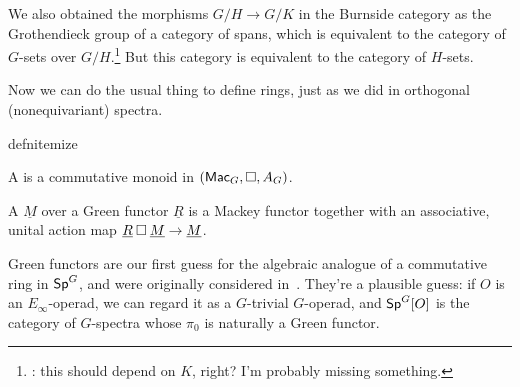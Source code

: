 We also obtained the morphisms $G/H\to G/K$ in the Burnside category as the Grothendieck group of a category of
spans, which is equivalent to the category of $G$-sets over $G/H$.\footnote{\TODO: this should depend on $K$,
right? I'm probably missing something.} But this category is equivalent to the category of $H$-sets.

Now we can do the usual thing to define rings, just as we did in orthogonal (nonequivariant) spectra.
\begin{comp}{defn}{itemize}
	\item A  is a commutative monoid in $(\mathsf{Mac}_G, \mathbin\square,
	A_G)$.
	\item A  $\underline M$ over a Green functor $\underline R$ is a
	Mackey functor together with an associative, unital action map $\underline R\mathbin\square\underline M\to\underline
	M$.
\end{comp}
Green functors are our first guess for the algebraic analogue of a commutative ring in $\mathsf{Sp}^G$, and were
originally considered in~\cite{Green}. They're a plausible guess: if $O$ is an $E_\infty$-operad, we can regard it
as a $G$-trivial $G$-operad, and $\mathsf{Sp}^G[O]$ is the category of $G$-spectra whose $\pi_0$ is naturally a Green
functor.

